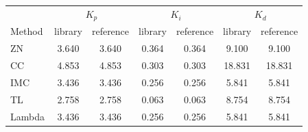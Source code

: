 \begin{tabular}{@{}lcccccc@{}}
\toprule
 & \multicolumn{2}{c}{$K_p$} & \multicolumn{2}{c}{$K_i$} & \multicolumn{2}{c}{$K_d$} \\
Method & library & reference & library & reference & library & reference \\
\midrule
ZN & 3.640 & 3.640 & 0.364 & 0.364 & 9.100 & 9.100 \\
CC & 4.853 & 4.853 & 0.303 & 0.303 & 18.831 & 18.831 \\
IMC & 3.436 & 3.436 & 0.256 & 0.256 & 5.841 & 5.841 \\
TL & 2.758 & 2.758 & 0.063 & 0.063 & 8.754 & 8.754 \\
Lambda & 3.436 & 3.436 & 0.256 & 0.256 & 5.841 & 5.841 \\
\bottomrule
\end{tabular}
